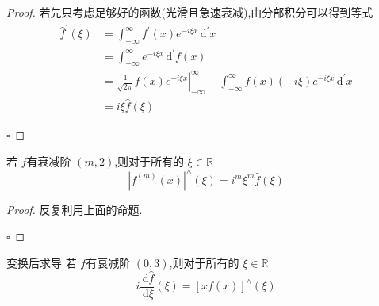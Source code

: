 \documentclass[../../PDE.tex]{subfiles}
\begin{document}
\begin{proof}
    若先只考虑足够好的函数(光滑且急速衰减),由分部积分可以得到等式 \[
   \begin{aligned}
    \hat{f}^{\prime} \left(  \xi  \right)&= \int_{-\infty}^{\infty}f^{\prime} \left( x \right)e^{-i  \xi x}\,\mathrm{d} ^{\prime} x\\ 
     &=  \int_{-\infty}^{\infty} e^{-i  \xi x} \,\mathrm{d} ^{\prime} f\left( x \right)\\ 
      &= \left. \frac{1 }{\sqrt{2\pi } }f\left( x \right)e^{-i  \xi x}  \right|_{-\infty}^{\infty}- \int_{-\infty}^{\infty}f\left( x \right) \left( -i \xi  \right)e^{-i \xi x}    \,\mathrm{d} ^{\prime} x\\ 
       &=  i \xi  \hat{f}\left(  \xi  \right) 
    \end{aligned}   
    \]

    \hfill $\square$
\end{proof}

\begin{corollary}
  若 \(  f  \)有衰减阶 \(  \left( m,2 \right)   \),则对于所有的 \(   \xi  \in \mathbb{R}   \) \[
  \left| f^{\left( m \right) }\left( x \right)  \right|^{\wedge }\left(  \xi  \right)= i^{m}  \xi ^{m}\hat{f}\left(  \xi  \right)   
  \]     
\end{corollary}
\begin{proof}
    反复利用上面的命题.

    \hfill $\square$
\end{proof}

\begin{proposition}{变换后求导}
    若 \(  f  \)有衰减阶 \(  \left( 0,3 \right)   \),则对于所有的 \(   \xi  \in \mathbb{R}   \) \[
    i \frac{\,\mathrm{d} \hat{f} }{ \,\mathrm{d}  \xi }\left(  \xi  \right)= \left[ xf\left( x \right)  \right]^{\wedge }\left(  \xi  \right)    
    \]   
\end{proposition}
\end{document}
